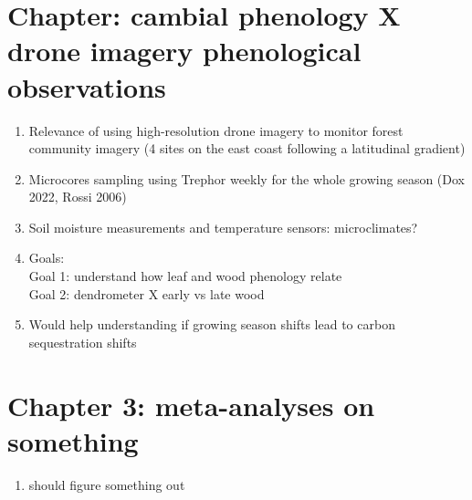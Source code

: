 \documentclass{article}
\begin{document}
\section*{Chapter: cambial phenology X drone imagery phenological observations}
\begin {enumerate}
	\item Relevance of using high-resolution drone imagery to monitor forest community imagery (4 sites on the east coast following a latitudinal gradient) 
	\item Microcores sampling using Trephor weekly for the whole growing season (Dox 2022, Rossi 2006)
	\item Soil moisture measurements and temperature sensors: microclimates? 
	\item Goals: \\
	Goal 1: understand how leaf and wood phenology relate \\
	Goal 2: dendrometer X early vs late wood\\
	\item Would help understanding if growing season shifts lead to carbon sequestration shifts
\end {enumerate}

\section*{Chapter 3: meta-analyses on something}
\begin {enumerate}
	\item should figure something out
\end {enumerate}

%
\end{document}
